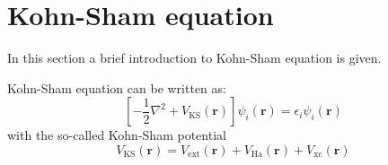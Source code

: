 \section{Kohn-Sham equation}

In this section a brief introduction to Kohn-Sham equation is given.

Kohn-Sham equation can be written as:
\begin{equation}
\left[
-\frac{1}{2}\nabla^2  + V_{\mathrm{KS}}(\mathbf{r})
\right] \psi_{i}(\mathbf{r}) =
\epsilon_{i}\psi_{i}(\mathbf{r})
\end{equation}
with the so-called Kohn-Sham potential
\begin{equation}
V_{\mathrm{KS}}(\mathbf{r}) = V_{\mathrm{ext}}(\mathbf{r}) + V_{\mathrm{Ha}}(\mathbf{r})
+ V_{\mathrm{xc}}(\mathbf{r})
\end{equation}


